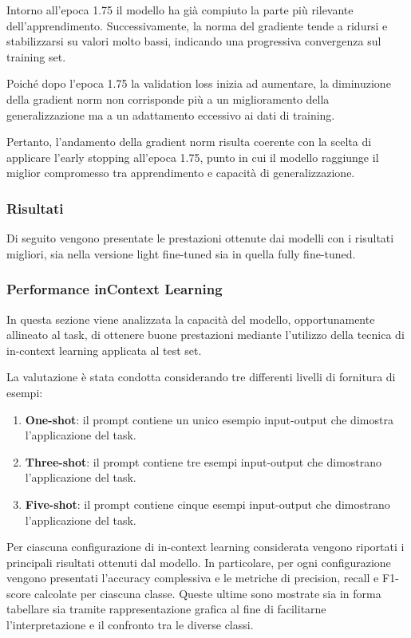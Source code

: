 \documentclass[a4paper,12pt]{article}
\begin{document}
Intorno all’epoca 1.75 il modello ha già compiuto la parte più rilevante dell’apprendimento. Successivamente, la norma del gradiente tende a ridursi e stabilizzarsi su valori molto bassi, indicando una progressiva convergenza sul training set.

Poiché dopo l’epoca 1.75 la validation loss inizia ad aumentare, la diminuzione della gradient norm non corrisponde più a un miglioramento della generalizzazione ma a un adattamento eccessivo ai dati di training.

Pertanto, l’andamento della gradient norm risulta coerente con la scelta di applicare l’early stopping all’epoca 1.75, punto in cui il modello raggiunge il miglior compromesso tra apprendimento e capacità di generalizzazione.


\subsubsection{Risultati}

Di seguito vengono presentate le prestazioni ottenute dai modelli con i risultati migliori, sia nella versione light fine-tuned sia in quella fully fine-tuned.

\subsubsection*{Performance inContext Learning}

In questa sezione viene analizzata la capacità del modello, opportunamente allineato al task, di ottenere buone prestazioni mediante l’utilizzo della tecnica di in-context learning applicata al test set.

La valutazione è stata condotta considerando tre differenti livelli di fornitura di esempi:

\begin{enumerate}
    \item \textbf{One-shot}: il prompt contiene un unico esempio input-output che dimostra l'applicazione del task.

    \item \textbf{Three-shot}: il prompt contiene tre esempi input-output che dimostrano l'applicazione del task.

    \item \textbf{Five-shot}: il prompt contiene cinque esempi input-output che dimostrano l'applicazione del task.
\end{enumerate}

Per ciascuna configurazione di in-context learning considerata vengono riportati i principali risultati ottenuti dal modello. In particolare, per ogni configurazione vengono presentati l’accuracy complessiva e le metriche di precision, recall e F1-score calcolate per ciascuna classe. Queste ultime sono mostrate sia in forma tabellare sia tramite rappresentazione grafica al fine di facilitarne l’interpretazione e il confronto tra le diverse classi.
\end{document}
